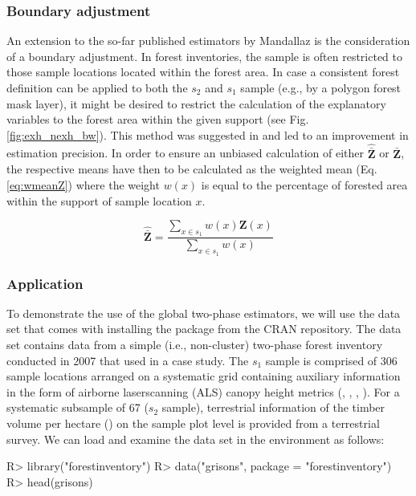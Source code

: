 \subsubsection{Boundary adjustment}

An extension to the so-far published estimators by Mandallaz is the consideration of a boundary adjustment. In forest inventories, the sample is often restricted to those sample locations located within the forest area. In case a consistent forest definition can be applied to both the $s_2$ and $s_1$ sample (e.g., by a polygon forest mask layer), it might be desired to restrict the calculation of the explanatory variables to the forest area within the given support (see Fig. \ref{fig:exh_nexh_bw}). This method was suggested in \citet{mandallaz2013b} and led to an improvement in estimation precision. In order to ensure an unbiased calculation of either $\hat{\bar{\pmb{Z}}}$ or $\bar{\pmb{Z}}$, the respective means have then to be calculated as the weighted mean (Eq. \ref{eq:wmeanZ}) where the weight $w(x)$ is equal to the percentage of forested area within the support of sample location $x$.

\begin{equation}\label{eq:wmeanZ}
  \hat{\bar{\pmb{Z}}}=\frac{\sum_{x\in{s_1}}w(x)\pmb{Z}(x)}{\sum_{x\in{s_1}}w(x)}
\end{equation}

\subsubsection{Application}

To demonstrate the use of the global two-phase estimators, we will use the  data set that comes with installing the package from the CRAN repository. The data set contains data from a simple (i.e., non-cluster) two-phase forest inventory conducted in 2007 that \citet{mandallaz2013b} used in a case study. The $s_1$ sample is comprised of 306 sample locations arranged on a systematic grid containing auxiliary information in the form of airborne laserscanning (ALS) canopy height metrics (, , , ). For a systematic subsample of 67 ($s_2$ sample), terrestrial information of the timber volume per hectare () on the sample plot level is provided from a terrestrial survey. We can load  and examine the  data set in the  environment as follows:

\begin{small}
\begin{Schunk}
\begin{Sinput}
R> library("forestinventory")
R> data("grisons", package = "forestinventory")
R> head(grisons)
\end{Sinput}
\end{Schunk}
\end{small}

